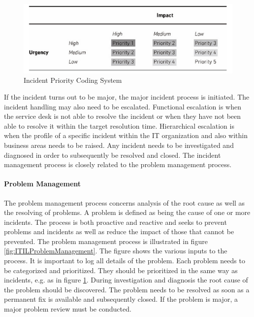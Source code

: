 \begin{figure}[ht]
\begin{center}
\hspace{-0.2cm}\includegraphics[scale=0.4]{ITILIncidentPrioritization.png}
\caption[ITIL Incident Priority Coding System]{Incident Priority Coding System \cite{itilbok}}
\label{fig:ITILIncidentPrioritization}
\end{center}
\end{figure}
\vspace{-0.06cm}
If the incident turns out to be major, the major incident process is initiated. The incident handling may also need to be escalated. Functional escalation is when the service desk is not able to resolve the incident or when they have not been able to resolve it within the target resolution time. Hierarchical escalation is when the profile of a specific incident within the IT organization and also within business areas needs to be raised. Any incident needs to be investigated and diagnosed in order to subsequently be resolved and closed. The incident management process is closely related to the problem management process.

\paragraph{Problem Management}
The problem management process concerns analysis of the root cause as well as the resolving of problems. A problem is defined as being the cause of one or more incidents. The process is both proactive and reactive and seeks to prevent problems and incidents as well as reduce the impact of those that cannot be prevented. The problem management process is illustrated in figure \ref{fig:ITILProblemManagement}. The figure shows the various inputs to the process. It is important to log all details of the problem. Each problem needs to be categorized and prioritized. They should be prioritized in the same way as incidents, e.g. as in figure \ref{fig:ITILIncidentPrioritization}. During investigation and diagnosis the root cause of the problem should be discovered. The problem needs to be resolved as soon as a permanent fix is available and subsequently closed. If the problem is major, a major problem review must be conducted.

